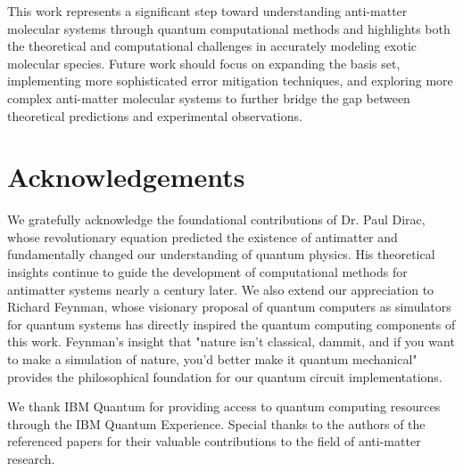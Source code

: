 \documentclass[10pt,twocolumn,a4paper]{article}
\begin{document}
This work represents a significant step toward understanding anti-matter molecular systems through quantum computational methods and highlights both the theoretical and computational challenges in accurately modeling exotic molecular species. Future work should focus on expanding the basis set, implementing more sophisticated error mitigation techniques, and exploring more complex anti-matter molecular systems to further bridge the gap between theoretical predictions and experimental observations.

\section{Acknowledgements}
We gratefully acknowledge the foundational contributions of Dr. Paul Dirac, whose revolutionary equation predicted the existence of antimatter and fundamentally changed our understanding of quantum physics. His theoretical insights continue to guide the development of computational methods for antimatter systems nearly a century later. We also extend our appreciation to Richard Feynman, whose visionary proposal of quantum computers as simulators for quantum systems has directly inspired the quantum computing components of this work. Feynman's insight that "nature isn't classical, dammit, and if you want to make a simulation of nature, you'd better make it quantum mechanical" provides the philosophical foundation for our quantum circuit implementations.

We thank IBM Quantum for providing access to quantum computing resources through the IBM Quantum Experience. Special thanks to the authors of the referenced papers for their valuable contributions to the field of anti-matter research.


\end{document}
